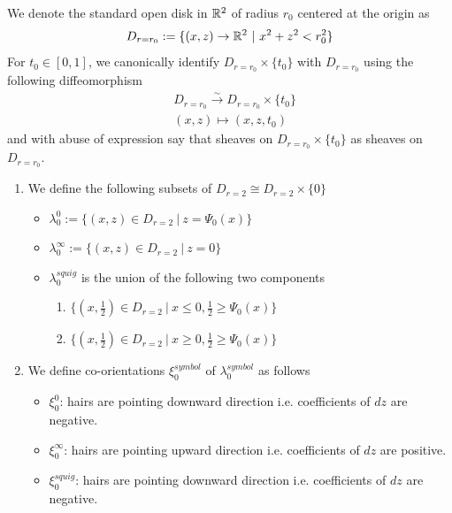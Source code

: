 \begin{definition}
We denote the standard open disk in $\mathbb{R}^2$ of radius $r_0$ centered at the origin as 
\[
D_{r=r_0} := \{(x,z)\rightarrow \mathbb{R}^2 ~|~ x^2+z^2 < r_0^2\}
\]
For $t_0 \in [0,1]$, we canonically identify $D_{r=r_0}\times \{t_0\}$ with $D_{r=r_0}$ using the following diffeomorphism
\begin{align*}
& D_{r=r_0} \xrightarrow{\sim} D_{r=r_0} \times \{t_0\} \\
& (x,z) \mapsto (x,z,t_0)
\end{align*}
and with abuse of expression say that sheaves on $D_{r=r_0}\times \{t_0\}$ as sheaves on $D_{r=r_0}$.
\end{definition}

\begin{definition}
\begin{enumerate}
\item We define the following subsets of $D_{r=2} \cong D_{r=2}\times \{0\}$
\begin{itemize}
\item $\lambda_0^0 := \{(x,z) \in D_{r=2} ~|~ z = \Psi_0(x)\}$

\item $\lambda_0^\infty := \{(x,z) \in D_{r=2} ~|~ z = 0 \}$

\item $\lambda_0^{squig}$ is the union of the following two components
\begin{enumerate}[label=(\roman*)]
\item $\{(x,\frac{1}{2}) \in D_{r=2} ~|~ x \leq 0, \frac{1}{2} \geq \Psi_0(x) \}$

\item $\{(x,\frac{1}{2}) \in D_{r=2} ~|~ x \geq 0,\frac{1}{2} \geq \Psi_0(x) \}$
\end{enumerate}
\end{itemize}

\item We define co-orientations $\xi_0^{symbol}$ of $\lambda_0^{symbol}$ as follows
\begin{itemize}
\item $\xi_0^0$: hairs are pointing downward direction i.e. coefficients of $dz$ are negative.

\item $\xi_0^\infty$: hairs are pointing upward direction i.e. coefficients of $dz$ are positive.

\item $\xi_0^{squig}$: hairs are pointing downward direction i.e. coefficients of $dz$ are negative.
\end{itemize}
\end{enumerate}
\end{definition}


